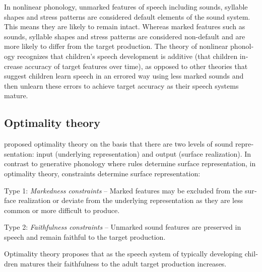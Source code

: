 \documentclass[output=paper,colorlinks,citecolor=brown]{langscibook}
\begin{document}
\begin{otherlanguage}{english}
In nonlinear phonology, unmarked features of speech including sounds, syllable shapes and stress patterns are considered default elements of the sound system. This means they are likely to remain intact. Whereas marked features such as sounds, syllable shapes and stress patterns are considered non-default and are more likely to differ from the target production. The theory of nonlinear phonology recognizes that children’s speech development is additive (that children increase accuracy of target features over time), as opposed to other theories that suggest children learn speech in an errored way using less marked sounds and then unlearn these errors to achieve target accuracy as their speech systems mature.
\subsection*{Optimality theory}
\citet{Prince1993a} proposed optimality theory on the basis that there are two levels of sound representation: input (underlying representation) and output (surface realization). In contrast to generative phonology where rules determine surface representation, in optimality theory, constraints determine surface representation:

Type 1: \emph{Markedness constraints} -- Marked features may be excluded from the surface realization or deviate from the underlying representation as they are less common or more difficult to produce.

Type 2: \emph{Faithfulness constraints} -- Unmarked sound features are preserved in speech and remain faithful to the target production.

Optimality theory proposes that as the speech system of typically developing children matures their faithfulness to the adult target production increases.



\end{otherlanguage}
\end{document}
